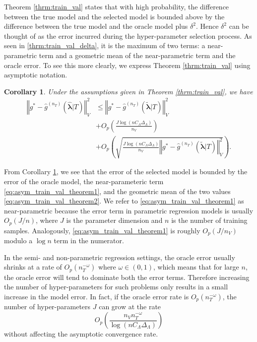 \documentclass[12pt]{article} %
\newtheorem{corollary}{Corollary}
\theoremstyle{definition}
\begin{document}
Theorem \ref{thrm:train_val} states that with high probability, the difference between the true model and the selected model is bounded above by the difference between the true model and the oracle model plus $\delta^2$. Hence $\delta^2$ can be thought of as the error incurred during the hyper-parameter selection process. As seen in \eqref{thrm:train_val_delta}, it is the maximum of two terms: a near-parametric term and a geometric mean of the near-parametric term and the oracle error. To see this more clearly, we express Theorem \ref{thrm:train_val} using asymptotic notation.
\begin{corollary}
	\label{corr:train_val}
	Under the assumptions given in Theorem \ref{thrm:train_val}, we have
	\begin{align}
	\left\Vert g^* - \hat{g}^{(n_T)}( \hat{\boldsymbol{\lambda}} | T) \right\Vert _{V}^2 &\le \left\Vert g^* - \hat{g}^{(n_T)}( \tilde{\boldsymbol{\lambda}} | T) \right \Vert^2_{V}\\
	& + O_p \left(\frac{J\log (n C_\Lambda \Delta_{\Lambda} )}{n_{V}} \right) 
	\label{eq:asym_train_val_theorem1} \\
	& + O_p \left(
	\sqrt{
		\frac{J \log (n C_\Lambda \Delta_{\Lambda} )}{n_{V}}
		\left\Vert g^* - \hat{g}^{(n_T)}( \tilde{\boldsymbol{\lambda}}| T) \right \Vert^2_{V}
	}
	\right ).
	\label{eq:asym_train_val_theorem2}
	\end{align}
\end{corollary}
From Corollary \ref{corr:train_val}, we see that the error of the selected model is bounded by the error of the oracle model, the near-parameteric term \eqref{eq:asym_train_val_theorem1}, and the geometric mean of the two values \eqref{eq:asym_train_val_theorem2}. We refer to \eqref{eq:asym_train_val_theorem1} as near-parametric because the error term in parametric regression models is usually $O_p(J/n)$, where $J$ is the parameter dimension and $n$ is the number of training samples. Analogously, \eqref{eq:asym_train_val_theorem1} is roughly $O_p(J/n_V)$ modulo a $\log n$ term in the numerator.

In the semi- and non-parametric regression settings, the oracle error usually shrinks at a rate of $O_p(n_T^{-\omega})$ where $\omega \in (0, 1)$, which means that for large $n$, the oracle error will tend to dominate both the error terms. Therefore increasing the number of hyper-parameters for such problems only results in a small increase in the model error. In fact, if the oracle error rate is $O_p(n_T^{-\omega})$, the number of hyper-parameters $J$ can grow at the rate
\begin{equation}
O_p\left (
\frac{n_{V} n_T^{-\omega}}{\log (n C_\Lambda\Delta_{\Lambda})}
\right )
\end{equation}
without affecting the asymptotic convergence rate.
\end{document}

